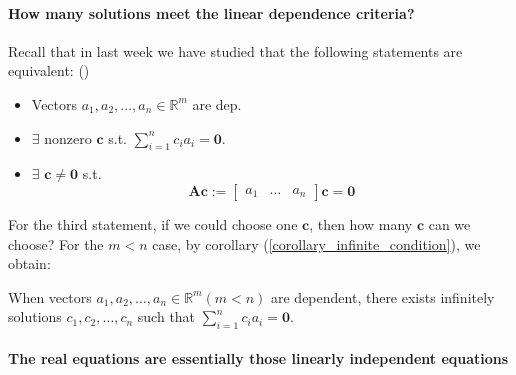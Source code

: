 \paragraph{How many solutions meet the linear dependence criteria?}
Recall that in last week we have studied that the following statements are equivalent: ()
\begin{itemize}
\item
Vectors $a_1,a_2,\dots,a_n\in\mathbb{R}^{m}$ are dep.
\item
$\exists$ nonzero $\bm c$ s.t. $\sum_{i=1}^{n}c_ia_i = \bm 0$.
\item
$\exists$ $\bm c\ne\bm 0$ s.t.
\[
\bm{Ac} := \left[\begin{array}{c|c|c}
a_1&\dots&a_n
\end{array}\right]\bm c = \bm 0
\]
\end{itemize}
For the third statement, if we could choose one $\bm c$, then how many $\bm c$ can we choose? For the $m<n$ case, by corollary (\ref{corollary_infinite_condition}), we obtain:
\begin{corollary}
When vectors $a_1,a_2,\dots,a_n\in\mathbb{R}^{m}(m<n)$ are dependent, there exists infinitely solutions $c_1,c_2,\dots,c_n$ such that $\sum_{i=1}^{n}c_ia_i = \bm 0$.
\end{corollary}
\paragraph{The real equations are essentially those linearly independent equations}
